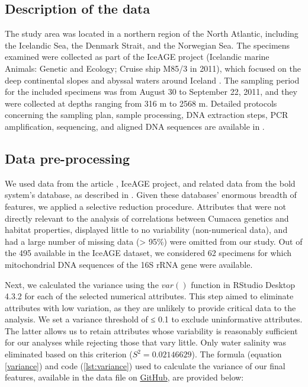 \subsection{Description of the data}
The study area was located in a northern region of the North Atlantic, including the Icelandic Sea, the Denmark Strait, and the Norwegian Sea. The specimens examined were collected as part of the IceAGE project (Icelandic marine Animals: Genetic and Ecology; Cruise ship M85/3 in 2011), which focused on the deep continental slopes and abyssal waters around Iceland \citep{meisner_prefacebiodiversity_2018}. The sampling period for the included specimens was from August 30 to September 22, 2011, and they were collected at depths ranging from 316 m to 2568 m. Detailed protocols concerning the sampling plan, sample processing, DNA extraction steps, PCR amplification, sequencing, and aligned DNA sequences are available in \citep{uhlir_adding_2021}.

\subsection{Data pre-processing}
We used data from the article \cite{uhlir_adding_2021}, IceAGE project, and related data from the bold system's database, as described in \citep{uhlir_adding_2021}. Given these databases' enormous breadth of features, we applied a selective reduction procedure. Attributes that were not directly relevant to the analysis of correlations between Cumacea genetics and habitat properties, displayed little to no variability (non-numerical data), and had a large number of missing data (> 95\%) were omitted from our study. Out of the 495 available in the IceAGE dataset, we considered 62 specimens for which mitochondrial DNA sequences of the 16S rRNA gene were available. 

Next, we calculated the variance using the $var()$ function in RStudio Desktop 4.3.2 for each of the selected numerical attributes. This step aimed to eliminate attributes with low variation, as they are unlikely to provide critical data to the analysis. We set a variance threshold of ≤ 0.1 to exclude uninformative attributes. The latter allows us to retain attributes whose variability is reasonably sufficient for our analyses while rejecting those that vary little. Only water salinity was eliminated based on this criterion ($S^2 = 0.02146629$). The formula (equation \ref{variance}) and code (\autoref{lst:variance}) used to calculate the variance of our final features, available in the data file on \href{https://github.com/tahiri-lab/Cumacea_aPhyloGeo}{GitHub}, are provided below:

